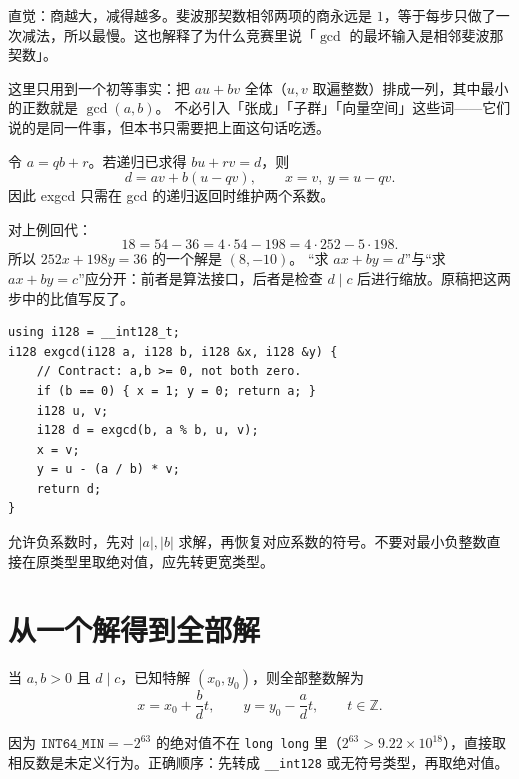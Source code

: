 \documentclass[UTF8,a4paper,11pt,oneside,openany,fontset=fandol]{ctexbook}
\theoremstyle{definition}
\newcommand{\Z}{\mathbb Z}
\begin{document}
\begin{tip}
直觉：商越大，减得越多。斐波那契数相邻两项的商永远是 $1$，等于每步只做了一次减法，所以最慢。这也解释了为什么竞赛里说「$\gcd$ 的最坏输入是相邻斐波那契数」。
\end{tip}

这里只用到一个初等事实：把 $au+bv$ 全体（$u,v$ 取遍整数）排成一列，其中最小的正数就是 $\gcd(a,b)$。
不必引入「张成」「子群」「向量空间」这些词——它们说的是同一件事，但本书只需要把上面这句话吃透。

令 $a=qb+r$。若递归已求得 $bu+rv=d$，则
\[
 d=av+b(u-qv),\qquad x=v,\ y=u-qv.
\]
因此 exgcd 只需在 gcd 的递归返回时维护两个系数。


对上例回代：
\[
18=54-36=4\cdot54-198=4\cdot252-5\cdot198.
\]
所以 $252x+198y=36$ 的一个解是 $(8,-10)$。
“求 $ax+by=d$”与“求 $ax+by=c$”应分开：前者是算法接口，后者是检查 $d\mid c$ 后进行缩放。原稿把这两步中的比值写反了。
\begin{lstlisting}
using i128 = __int128_t;
i128 exgcd(i128 a, i128 b, i128 &x, i128 &y) {
    // Contract: a,b >= 0, not both zero.
    if (b == 0) { x = 1; y = 0; return a; }
    i128 u, v;
    i128 d = exgcd(b, a % b, u, v);
    x = v;
    y = u - (a / b) * v;
    return d;
}
\end{lstlisting}
允许负系数时，先对 $|a|,|b|$ 求解，再恢复对应系数的符号。不要对最小负整数直接在原类型里取绝对值，应先转更宽类型。


\section{从一个解得到全部解}
当 $a,b>0$ 且 $d\mid c$，已知特解 $(x_0,y_0)$，则全部整数解为
\[
 x=x_0+\frac bd t,\qquad y=y_0-\frac ad t,\qquad t\in\Z.
\]

\begin{tip}
因为 $\texttt{INT64\_MIN}=-2^{63}$ 的绝对值不在 \texttt{long long} 里（$2^{63}>9.22\times10^{18}$），直接取相反数是未定义行为。正确顺序：先转成 \texttt{\_\_int128} 或无符号类型，再取绝对值。
\end{tip}
\end{document}

